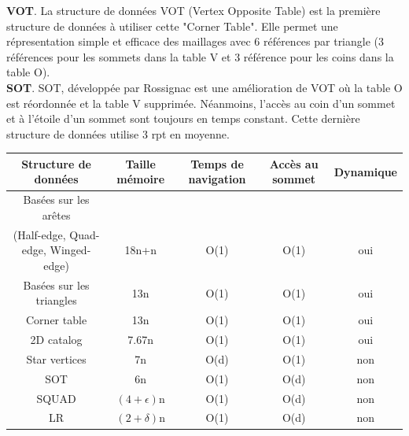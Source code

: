 \documentclass[a4paper,11pt,openany]{article}
\begin{document}
\noindent
\textbf{VOT}. La structure de données VOT (Vertex Opposite Table) est la première structure de données à utiliser cette "Corner Table". Elle permet une répresentation simple et efficace des maillages avec 6 références par triangle (3 références pour les sommets dans la table V et 3 référence pour les coins dans la table O).\\
\textbf{SOT}. SOT, développée par Rossignac \cite{SOT} est une amélioration de VOT où la table O est réordonnée et la table V supprimée. Néanmoins, l'accès au coin d'un sommet et à l'étoile d'un sommet sont toujours en temps constant. Cette dernière structure de données utilise 3 rpt en moyenne.

\footnotesize
\begin{tabular}{|c | c | c | c | c|}
\hline
Structure de données & Taille mémoire & Temps de navigation & Accès au sommet & Dynamique\\
\hline
Basées sur les arêtes\\(Half-edge, Quad-edge, Winged-edge) & 18n+n & O(1) & O(1) & oui\\
Basées sur les triangles & 13n & O(1) & O(1) & oui\\		
Corner table & 13n & O(1) & O(1) & oui\\
\hline
2D catalog & 7.67n & O(1) & O(1) & oui\\
\hline
Star vertices & 7n & O(d) & O(1) & non\\		
SOT & 6n & O(1) & O(d) & non\\
SQUAD & $(4+\epsilon)$n & O(1) & O(d) & non\\
LR & $(2+\delta)$n & O(1) & O(d) & non\\
\hline  
\end{tabular}

\normalsize
\end{document}
